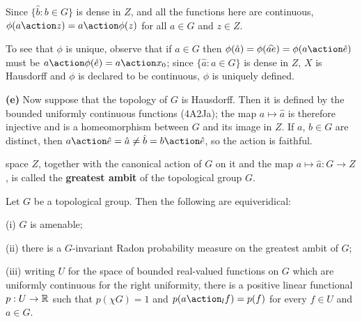 {\noindent Since $\{\hat b:b\in G\}$ is dense in $Z$, and all the
functions here are continuous, $\phi(a\action z)=a\action\phi(z)$ for
all $a\in G$ and $z\in Z$.

To see that $\phi$ is unique, observe that if $a\in G$ then
$\phi(\hat a)=\phi(\widehat{ae})=\phi(a\action\hat{e})$ must be
$a\action\phi(\hat e)=a\action x_0$;  since $\{\hat a:a\in G\}$ is dense in
$Z$, $X$ is Hausdorff and $\phi$ is declared to be continuous, $\phi$ is
uniquely defined.

\medskip

{\bf (e)} Now suppose that the topology of $G$ is Hausdorff.   Then it
is defined by the bounded uniformly continuous functions (4A2Ja);
the map $a\mapsto\hat a$ is therefore injective and is a homeomorphism
between $G$ and its image in $Z$.   If $a$, $b\in G$ are distinct,
then
$a\action\hat e=\hat a\ne\hat b=b\action\hat e$, so the action is
faithful.
}%

\medskip

  space
$Z$, together
with the canonical action of $G$ on it and the map
$a\mapsto\hat a:G\to Z$, is called the {\bf greatest ambit} of the
topological group $G$.

 Let $G$ be a topological group.   Then the
following are equiveridical:

(i) $G$ is amenable;

(ii) there is a $G$-invariant Radon probability measure on the
greatest ambit of $G$;

(iii) writing $U$ for the space of bounded real-valued functions on
$G$ which are uniformly continuous for the right uniformity, there is
a
positive linear functional $p:U\to\Bbb R$ such that $p(\chi G)=1$ and
$p(a\action_lf)=p(f)$ for every $f\in U$ and $a\in G$.

